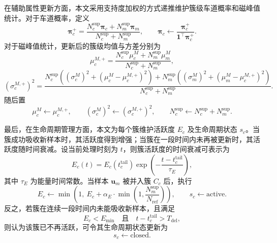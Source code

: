 \documentclass{xdupgthesis}
\begin{document}
在辅助属性更新方面，本文采用支持度加权的方式递推维护簇级车道概率和磁峰值统计。对于车道概率，定义
\begin{equation}
	\boldsymbol{\pi}_c^{+}
	=
	\frac{N_c^{\mathrm{sup}}\boldsymbol{\pi}_c+N_m^{\mathrm{sup}}\boldsymbol{\pi}_m}{N_c^{\mathrm{sup}}+N_m^{\mathrm{sup}}},
	\qquad
	\boldsymbol{\pi}_c
	\leftarrow
	\frac{\boldsymbol{\pi}_c^{+}}{\mathbf{1}^{\top}\boldsymbol{\pi}_c^{+}}.
\end{equation}
对于磁峰值统计，更新后的簇级均值与方差分别为
\begin{equation}
	\mu_c^{M,+}
	=
	\frac{N_c^{\mathrm{sup}}\mu_c^{M}+N_m^{\mathrm{sup}}\mu_m^{M}}{N_c^{\mathrm{sup}}+N_m^{\mathrm{sup}}},
\end{equation}
\begin{equation}
	(\sigma_c^{M,+})^{2}
	=
	\frac{
		N_c^{\mathrm{sup}}\left((\sigma_c^{M})^{2}+(\mu_c^{M}-\mu_c^{M,+})^2\right)
		+
		N_m^{\mathrm{sup}}\left((\sigma_m^{M})^{2}+(\mu_m^{M}-\mu_c^{M,+})^2\right)
	}{
		N_c^{\mathrm{sup}}+N_m^{\mathrm{sup}}
	}.
\end{equation}
随后置
\begin{equation}
	\mu_c^{M} \leftarrow \mu_c^{M,+}, \qquad
	(\sigma_c^{M})^{2} \leftarrow (\sigma_c^{M,+})^{2}, \qquad
	N_c^{\mathrm{sup}} \leftarrow N_c^{\mathrm{sup}}+N_m^{\mathrm{sup}}.
\end{equation}

最后，在生命周期管理方面，本文为每个簇维护活跃度 $E_c$ 及生命周期状态 $s_c$。当簇成功吸收新样本时，其活跃度得到增强；当簇在一段时间内未再被更新时，其活跃度随时间衰减。设当前处理时刻为 $t$，则簇活跃度的时间衰减可表示为
\begin{equation}
	E_c(t)=E_c(t_c^{\mathrm{tail}})\exp\!\left(-\frac{t-t_c^{\mathrm{tail}}}{\tau_E}\right),
\end{equation}
其中 $\tau_E$ 为能量时间常数。当样本 $\mathbf{u}_m$ 被并入簇 $C_c$ 后，执行
\begin{equation}
	E_c \leftarrow \min\!\left(1,\ E_c+\alpha_E\cdot \min\!\left(1,\frac{N_m^{\mathrm{sup}}}{N_{\mathrm{ref}}}\right)\right),
	\qquad
	s_c \leftarrow \mathrm{active}.
\end{equation}
反之，若簇在连续一段时间内未能吸收新样本，且满足
\begin{equation}
	E_c < E_{\min}
	\quad \text{且} \quad
	t-t_c^{\mathrm{tail}} > T_{\mathrm{del}},
\end{equation}
则认为该簇已不再活跃，可令其生命周期状态更新为
\begin{equation}
	s_c \leftarrow \mathrm{closed}.
\end{equation}
\end{document}
